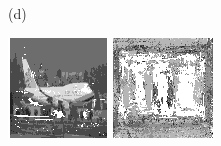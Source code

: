 \documentclass{article}
\begin{document}
\begin{figure}[t]
\begin{minipage}[c]{.21\linewidth}
  \end{minipage}
  \begin{minipage}[c]{.1\linewidth}
    \centering\centerline{(d)}
  \end{minipage}
  \begin{minipage}[c]{.21\linewidth}
    \centering\centerline{\includegraphics[width=\linewidth]{imgs/gens_cal/airplane/sums/13_2.png}}
  \end{minipage}
  \begin{minipage}[c]{.21\linewidth}
    \centering\centerline{\includegraphics[width=\linewidth]{imgs/gens_cal/dollar/sums/0_2.png}}

\end{minipage}
\end{figure}
\end{document}
